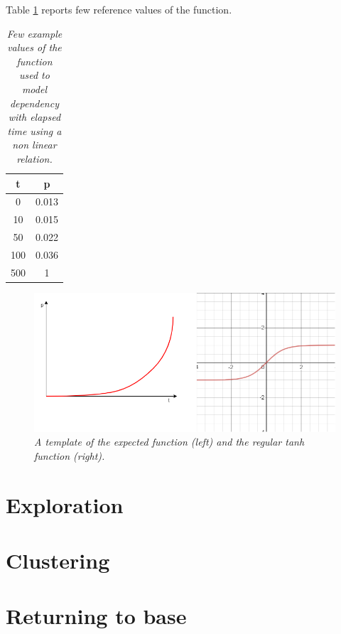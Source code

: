 \noindent
Table \ref{tab:f-values} reports few reference values of the function.

\begin{table}[H]
\centering
\begin{tabular}{| c | c |}

\hline
t & p \\
\hline
 0  & 0.013 \\
 10 & 0.015 \\
 50 & 0.022 \\
100 & 0.036 \\
500 & 1 \\
\hline

\end{tabular}
\caption{\label{tab:f-values}\textit{Few example values of the function used to model dependency with elapsed time using a non linear relation.}}
\end{table}

\begin{figure}[H]
\centering
\includegraphics[width=\linewidth]{images/tanh.png}
\caption{\textit{A template of the expected function (left) and the regular tanh function (right).}}
\label{fig:tanh}
\end{figure}

\section{Exploration}

\section{Clustering}

\section{Returning to base}

